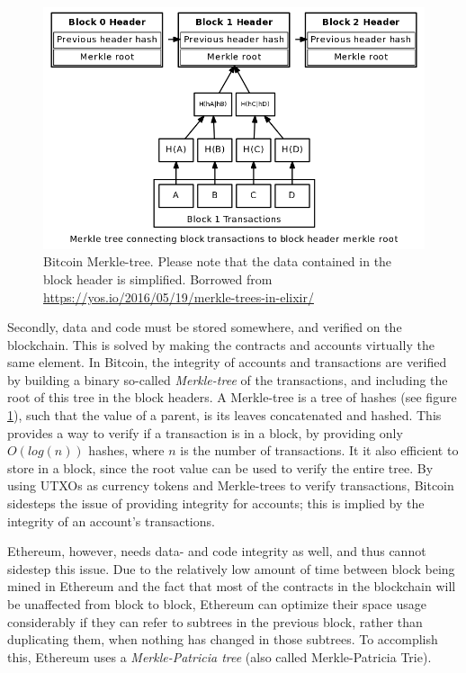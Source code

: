 \documentclass{article}
\begin{document}
			\begin{figure}[!ht]
				\centering
				\includegraphics[scale=0.4, trim={0 1.2cm 0 0}, clip=true]{figures/merkle-tree.png}
			 	\caption[Bitcoin Merkle-tree]
			 	{Bitcoin Merkle-tree. Please note that the data contained in the block header is simplified. Borrowed from \url{https://yos.io/2016/05/19/merkle-trees-in-elixir/}}
			 	\label{fig:bitcoin-merkle-tree}
			\end{figure}

			Secondly, data and code must be stored somewhere, and verified on the blockchain.
			This is solved by making the contracts and accounts virtually the same element.  
			In Bitcoin, the integrity of accounts and transactions are verified by building a binary so-called \emph{Merkle-tree} of the transactions, and including the root of this tree in the block headers. 
			A Merkle-tree is a tree of hashes (see figure \ref{fig:bitcoin-merkle-tree}), such that the value of a parent, is its leaves concatenated and hashed. 
			This provides a way to verify if a transaction is in a block, by providing only $O(log(n))$ hashes, where $n$ is the number of transactions.
			It it also efficient to store in a block, since the root value can be used to verify the entire tree.
			By using UTXOs as currency tokens and Merkle-trees to verify transactions, Bitcoin sidesteps the issue of providing integrity for accounts; this is implied by the integrity of an account's transactions. 

			Ethereum, however, needs data- and code integrity as well, and thus cannot sidestep this issue.
			Due to the relatively low amount of time between block being mined in Ethereum and the fact that most of the contracts in the blockchain will be unaffected from block to block, Ethereum can optimize their space usage considerably if they can refer to subtrees in the previous block, rather than duplicating them, when nothing has changed in those subtrees. 
			To accomplish this, Ethereum uses a \emph{Merkle-Patricia tree} (also called Merkle-Patricia Trie). 
\end{document}
